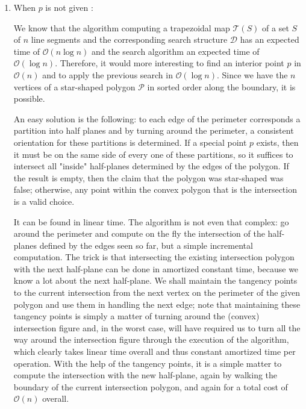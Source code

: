 \documentclass[11pt]{article}
\begin{document}
\begin{enumerate}[1.]
    \item When $p$ is not given \cite{hw3}: 
    
    We know that the algorithm computing a trapezoidal map $\mathcal{T}(S)$ of a set $S$  of $n$ line segments and the corresponding search structure $\mathcal{D}$ has an expected time of $\mathcal{O}(n\log n)$ and the search algorithm an expected time of $\mathcal{O}(\log n)$. Therefore, it would more interesting to find an interior point $p$ in $\mathcal{O}(n)$ and to apply the previous search in $\mathcal{O}(\log n)$. Since we have the $n$ vertices of a star-shaped polygon $\mathcal{P}$ in sorted order along the boundary, it is possible.

    An easy solution is the following: to each edge of the perimeter corresponds a partition into half planes and by turning around the perimeter, a consistent orientation for these partitions is determined. If a special point $p$ exists, then it must be on the same side of every one of these partitions, so it suffices to intersect all "inside" half-planes determined by the edges of the polygon. If the result is empty, then the claim that the polygon was star-shaped was false; otherwise, any point within the convex polygon that is the intersection is a valid choice. 

    It can be found in linear time. The algorithm is not even that complex: go around the perimeter and compute on the fly the intersection of the half-planes defined by the edges seen so far, but a simple incremental computation. The trick is that intersecting the existing intersection polygon with the next half-plane can be done in amortized constant time, because we know a lot about the next half-plane. We shall maintain the tangency points to the current intersection from the next vertex on the perimeter of the given polygon and use them in handling the next edge; note that maintaining these tangency points is simply a matter of turning around the (convex) intersection figure and, in the worst case, will have required us to turn all the way around the intersection figure through the execution of the algorithm, which clearly takes linear time overall and thus constant amortized time per operation. With the help of the tangency points, it is a simple matter to compute the intersection with the new half-plane, again by walking the boundary of the current intersection polygon, and again for a total cost of $\mathcal{O}(n)$ overall. 
    
\end{enumerate}

\FloatBarrier
\newpage













\end{document}
